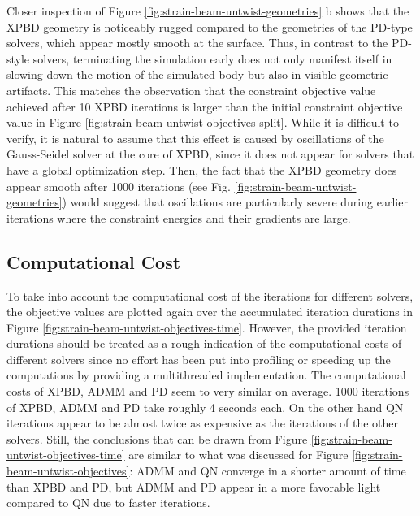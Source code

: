 Closer inspection of Figure \ref{fig:strain-beam-untwist-geometries} b shows that the XPBD geometry is noticeably rugged compared to the geometries of the PD-type 
solvers, which 
appear mostly smooth at the surface. Thus, in contrast to the PD-style solvers, terminating the simulation early does not only manifest itself in slowing down 
the motion of the simulated body but also in visible geometric artifacts. This matches the observation that the constraint objective value achieved after 10 XPBD iterations 
is larger than the initial constraint objective value in Figure \ref{fig:strain-beam-untwist-objectives-split}. While it is difficult to verify, it is natural to assume that this 
effect is caused by oscillations of the Gauss-Seidel solver at the core of XPBD, since it does not appear for solvers that have a global optimization step. Then, the 
fact that the XPBD geometry does appear smooth after 1000 iterations (see Fig. \ref{fig:strain-beam-untwist-geometries}) would suggest that oscillations are particularly 
severe during earlier iterations where the constraint energies and their gradients are large.

\subsection{Computational Cost}\label{ss:computational-cost-strain}
To take into account the computational cost of the iterations for different solvers, the objective values are plotted again over the accumulated
iteration durations in Figure \ref{fig:strain-beam-untwist-objectives-time}. However, the provided iteration durations should be treated as a rough indication of the 
computational costs of different solvers since no effort has been put into profiling or speeding up the computations by providing a multithreaded 
implementation. The computational costs of XPBD, ADMM and PD seem to very similar on average. 1000 iterations of XPBD, ADMM and PD take roughly 4 seconds each. On the other hand 
QN iterations appear to be almost twice as expensive as the iterations of the other solvers. Still, the conclusions that can be drawn from Figure 
\ref{fig:strain-beam-untwist-objectives-time} are similar to what was discussed for Figure \ref{fig:strain-beam-untwist-objectives}: ADMM and QN converge in a shorter amount 
of time than XPBD and PD, but ADMM and PD appear in a more favorable light compared to QN due to faster iterations.

